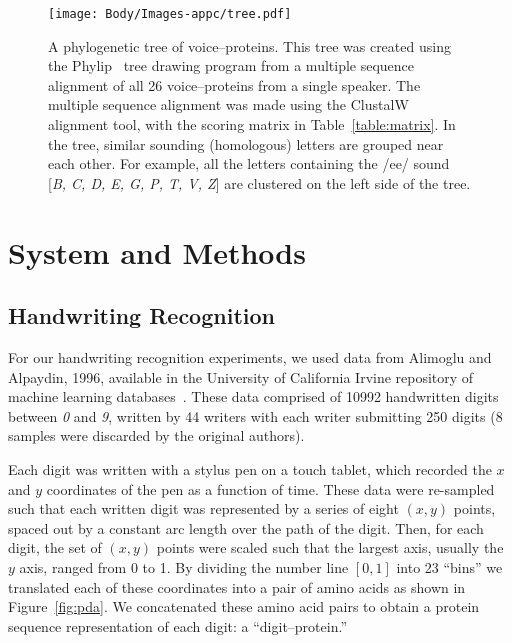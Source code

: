 		\begin{figure}[ptbh]
		\centering
		\texttt{[image: Body/Images-appc/tree.pdf]}
		\caption[A PDA digit]{
			A phylogenetic tree of voice--proteins.
			This tree was created using the
			Phylip~\cite{felsenstein1989phylip} tree drawing
			program from a multiple sequence alignment of
			all 26 voice--proteins from a single speaker.
			The multiple sequence alignment was made using the
			ClustalW~\cite{higgins1992improved} alignment tool,
			with the scoring matrix in Table~\vref{table:matrix}.
			In the tree, similar sounding (homologous) letters
			are grouped near each other.  For example, all the
			letters containing the /ee/ sound [\emph{B, C, D,
			E, G, P, T, V, Z}] are clustered on the left side
			of the tree.
		} \label{fig:tree} \end{figure}



\section{System and Methods}
	\subsection{Handwriting Recognition}
		For our handwriting recognition experiments, we used
		data from Alimoglu and Alpaydin, 1996, available in the
		University of California Irvine repository of machine
		learning databases~\cite{uci1998ucirepository}.  These data
		comprised of 10992 handwritten digits between \emph{0}
		and \emph{9}, written by 44 writers with each writer
		submitting 250 digits (8 samples were discarded by the
		original authors).

		Each digit was written with a stylus pen on a touch tablet,
		which recorded the $x$ and $y$ coordinates of the pen as a
		function of time.  These data were re-sampled such that each
		written digit was represented by a series of eight $(x,y)$
		points, spaced out by a constant arc length over the path of
		the digit.  Then, for each digit, the set of $(x,y)$ points
		were scaled such that the largest axis, usually the $y$ axis,
		ranged from 0 to 1.  By dividing the number line $[0,1]$
		into 23 ``bins'' we translated each of these coordinates
		into a pair of amino acids as shown in Figure~\vref{fig:pda}.
		We concatenated these amino acid pairs to obtain a protein
		sequence representation of each digit: a ``digit--protein.''



